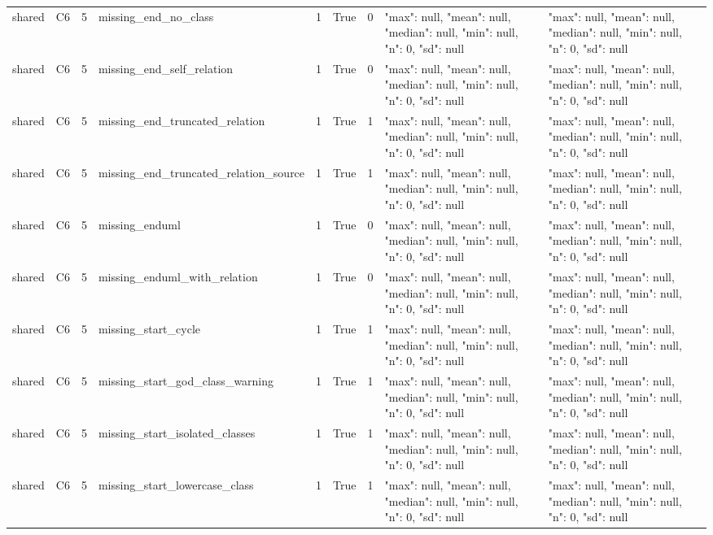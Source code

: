 \begin{tabular}{lllllllll}
shared & C6 & 5 & missing\_end\_no\_class & 1 & True & 0 & {"max": null, "mean": null, "median": null, "min": null, "n": 0, "sd": null} & {"max": null, "mean": null, "median": null, "min": null, "n": 0, "sd": null} \\
shared & C6 & 5 & missing\_end\_self\_relation & 1 & True & 0 & {"max": null, "mean": null, "median": null, "min": null, "n": 0, "sd": null} & {"max": null, "mean": null, "median": null, "min": null, "n": 0, "sd": null} \\
shared & C6 & 5 & missing\_end\_truncated\_relation & 1 & True & 1 & {"max": null, "mean": null, "median": null, "min": null, "n": 0, "sd": null} & {"max": null, "mean": null, "median": null, "min": null, "n": 0, "sd": null} \\
shared & C6 & 5 & missing\_end\_truncated\_relation\_source & 1 & True & 1 & {"max": null, "mean": null, "median": null, "min": null, "n": 0, "sd": null} & {"max": null, "mean": null, "median": null, "min": null, "n": 0, "sd": null} \\
shared & C6 & 5 & missing\_enduml & 1 & True & 0 & {"max": null, "mean": null, "median": null, "min": null, "n": 0, "sd": null} & {"max": null, "mean": null, "median": null, "min": null, "n": 0, "sd": null} \\
shared & C6 & 5 & missing\_enduml\_with\_relation & 1 & True & 0 & {"max": null, "mean": null, "median": null, "min": null, "n": 0, "sd": null} & {"max": null, "mean": null, "median": null, "min": null, "n": 0, "sd": null} \\
shared & C6 & 5 & missing\_start\_cycle & 1 & True & 1 & {"max": null, "mean": null, "median": null, "min": null, "n": 0, "sd": null} & {"max": null, "mean": null, "median": null, "min": null, "n": 0, "sd": null} \\
shared & C6 & 5 & missing\_start\_god\_class\_warning & 1 & True & 1 & {"max": null, "mean": null, "median": null, "min": null, "n": 0, "sd": null} & {"max": null, "mean": null, "median": null, "min": null, "n": 0, "sd": null} \\
shared & C6 & 5 & missing\_start\_isolated\_classes & 1 & True & 1 & {"max": null, "mean": null, "median": null, "min": null, "n": 0, "sd": null} & {"max": null, "mean": null, "median": null, "min": null, "n": 0, "sd": null} \\
shared & C6 & 5 & missing\_start\_lowercase\_class & 1 & True & 1 & {"max": null, "mean": null, "median": null, "min": null, "n": 0, "sd": null} & {"max": null, "mean": null, "median": null, "min": null, "n": 0, "sd": null} \\

\end{tabular}
